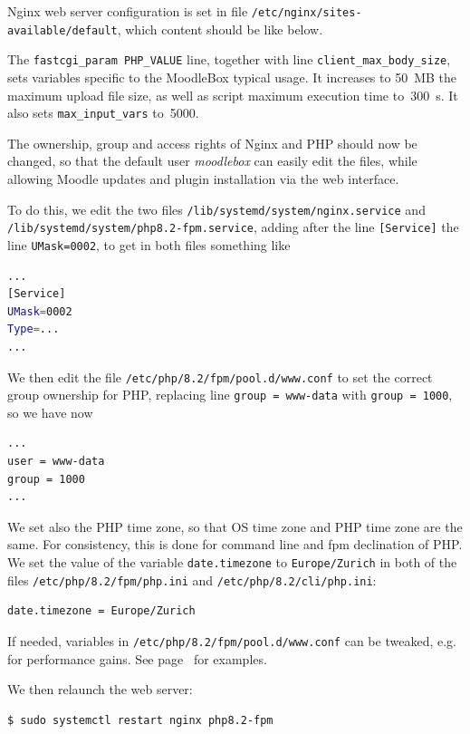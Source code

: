 \documentclass[12pt]{article}
\begin{document}
Nginx web server configuration is set in file \lstinline{/etc/nginx/sites-available/default}, which content should be like below.


The \lstinline{fastcgi_param PHP_VALUE} line, together with line \lstinline{client_max_body_size}, sets variables specific to the MoodleBox typical usage.
It increases to 50~MB the maximum upload file size, as well as script maximum execution time to~300~s.
It also sets \lstinline{max_input_vars} to~5000.

The ownership, group and access rights of Nginx and PHP should now be changed, so that the default user \emph{moodlebox} can easily edit the files, while allowing Moodle updates and plugin installation via the web interface.

To do this, we edit the two files \lstinline{/lib/systemd/system/nginx.service} and \lstinline{/lib/systemd/system/php8.2-fpm.service}, adding after the line \lstinline{[Service]} the line \lstinline{UMask=0002}, to get in both files something like
\begin{lstlisting}[language=bash]
...
[Service]
UMask=0002
Type=...
...
\end{lstlisting}
We then edit the file \lstinline{/etc/php/8.2/fpm/pool.d/www.conf} to set the correct group ownership for PHP, replacing line \lstinline{group = www-data} with \lstinline{group = 1000}, so we have now
\begin{lstlisting}[language=bash]
...
user = www-data
group = 1000
...
\end{lstlisting}
We set also the PHP time zone, so that OS time zone and PHP time zone are the same.
For consistency, this is done for command line and fpm declination of PHP.
We set the value of the variable \lstinline{date.timezone} to \lstinline{Europe/Zurich} in both of the files \lstinline{/etc/php/8.2/fpm/php.ini} and \lstinline{/etc/php/8.2/cli/php.ini}:
\begin{lstlisting}[language=bash]
date.timezone = Europe/Zurich
\end{lstlisting}

If needed, variables in \lstinline{/etc/php/8.2/fpm/pool.d/www.conf} can be tweaked, e.g. for performance gains. See page~\pageref{ssec-php-optimisation} for examples.

We then relaunch the web server:
\begin{lstlisting}[language=bash]
$ sudo systemctl restart nginx php8.2-fpm
\end{lstlisting}
\end{document}

